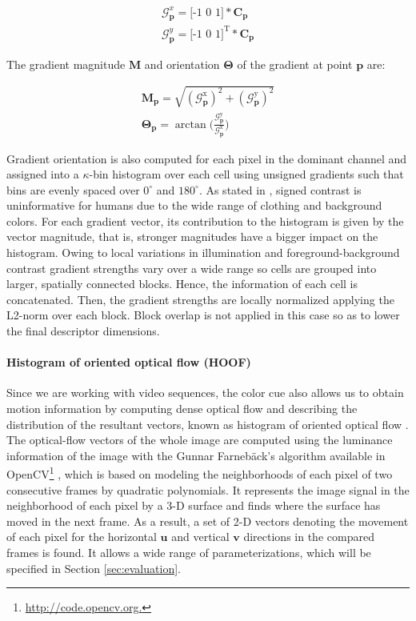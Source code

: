 \documentclass[10pt,twocolumn,letterpaper]{article}
\begin{document}
\begin{gather}
\mathcal{G}_\mathbf{p}^x = \mbox{[-1 0 1]} \ast \mathbf{C}_\mathbf{p} \label{eq:gx} \\[2ex]
\mathcal{G}_\mathbf{p}^y = \mbox{[-1 0 1]}^\mathrm{T} \ast \mathbf{C}_\mathbf{p} \label{eq:gy}
\end{gather}

The gradient magnitude $\mathbf{M}$ and orientation $\mathbf{\Theta}$ of the gradient at point $\mathbf{p}$ are:

\begin{gather}
\mathbf{M}_{\mathbf{p}} = \sqrt{(\mathcal{G}_{\mathbf{p}}^{\mathrm{x}})^2 + (\mathcal{G}_{\mathbf{p}}^{\mathrm{y}})^2} \label{eq:magnitude}\\[2ex]
\mathbf{\Theta}_{\mathbf{p}} = \arctan \Big(\frac{\mathcal{G}_{\mathbf{p}}^{\mathrm{y}}}{\mathcal{G}_{\mathbf{p}}^{\mathrm{x}}}\Big) \label{eq:orientation}
\end{gather}

Gradient orientation is also computed for each pixel in the dominant channel and assigned into a $\kappa$-bin histogram over each cell using unsigned gradients such that bins are evenly spaced over $0^\circ$ and $180^\circ$. As stated in \cite{dalal2005histograms}, signed contrast is uninformative for humans due to the wide range of clothing and background colors. For each gradient vector, its contribution to the histogram is given by the vector magnitude, that is, stronger magnitudes have a bigger impact on the histogram. Owing to local variations in illumination and foreground-background contrast gradient strengths vary over a wide range so cells are grouped into larger, spatially connected blocks. Hence, the information of each cell is concatenated. Then, the gradient strengths are locally normalized applying the L2-norm over each block. Block overlap is not applied in this case so as to lower the final descriptor dimensions. 

\paragraph{Histogram of oriented optical flow (HOOF)} 
Since we are working with video sequences, the color cue also allows us to obtain motion information by computing dense optical flow and describing the distribution of the resultant vectors, known as histogram of oriented optical flow \cite{dalal2006human}. The optical-flow vectors of the whole image are computed using the luminance information of the image with the Gunnar Farneb\"{a}ck's algorithm \cite{farneback2003two} available in OpenCV\footnote{\url{http://code.opencv.org.}} \cite{bradski2008learning}, which is based on modeling the neighborhoods of each pixel of two consecutive frames by quadratic polynomials. It represents the image signal in the neighborhood of each pixel by a 3-D surface and finds where the surface has moved in the next frame. As a result, a set of 2-D vectors denoting the movement of each pixel for the horizontal $\mathbf{u}$ and vertical $\mathbf{v}$ directions in the compared frames is found. It allows a wide range of parameterizations, which will be specified in Section \ref{sec:evaluation}.
\end{document}
